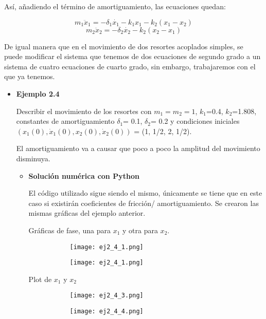 \documentclass[12pt]{article}
\begin{document}
Así, añadiendo el término de amortiguamiento, las ecuaciones quedan:

\begin{equation}
m_1 \ddot x_1 = -\delta _1 \dot{x_1} -k_1x_1 - k_2(x_1-x_2)
\end{equation}
\begin{equation}
m_2 \ddot x_2 = -\delta _2 \dot{x_2} -k_2(x_2-x_1)
\end{equation}

De igual manera que en el movimiento de dos resortes acoplados simples, se puede modificar el sistema que tenemos de dos ecuaciones de segundo grado a un sistema de cuatro ecuaciones de cuarto grado, sin embargo, trabajaremos con el que ya tenemos. 

\begin{itemize}
\item \textbf{Ejemplo 2.4}

Describir el movimiento de los resortes con $m_1 = m_2 = 1$, $k_1$=0.4, $k_2$=1.808, constantes de amortiguamiento $\delta _1$= 0.1, $\delta _2$= 0.2 y condiciones iniciales $(x_1(0), \dot x_1(0), x_2(0), \dot x_2(0))$ = (1, 1/2, 2, 1/2).

El amortiguamiento va a causar que poco a poco la amplitud del movimiento disminuya. 

\begin{itemize}
\item \textbf{Solución numérica con Python}

El código utilizado sigue siendo el mismo, únicamente se tiene que en este caso si existirán coeficientes de fricción/ amortiguamiento.
Se crearon las mismas gráficas del ejemplo anterior.

Gráficas de fase, una para $x_1$ y otra para $x_2$.

\begin{figure}[h!]
\begin{subfigure}{.45\textwidth}
\centering
\texttt{[image: ej2\_4\_1.png]}
\end{subfigure}
\begin{subfigure}{.45\textwidth}
\centering
\texttt{[image: ej2\_4\_1.png]}
\end{subfigure}
\end{figure}

Plot de $x_1$ y $x_2$
\begin{figure}[h!]
\begin{subfigure}{.55\textwidth}
\centering
\texttt{[image: ej2\_4\_3.png]}
\end{subfigure}
\begin{subfigure}{.55\textwidth}
\centering
\texttt{[image: ej2\_4\_4.png]}
\end{subfigure}
\end{figure}


\end{itemize}
\end{itemize}
\end{document}
